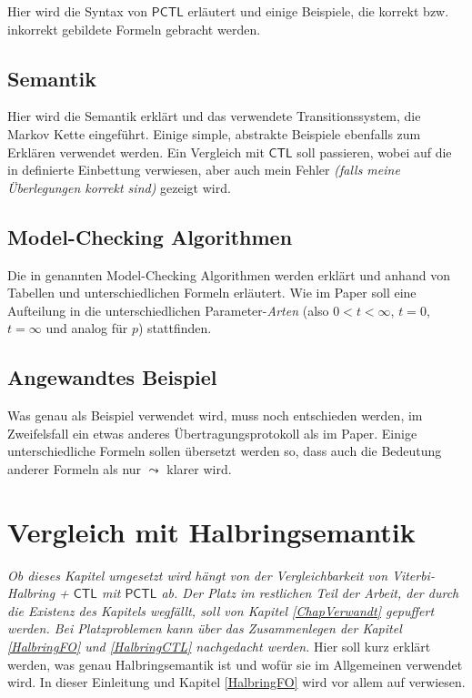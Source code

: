 \documentclass{lni}
\newcommand{\CTL}{\mathsf{CTL}}
\newcommand{\PCTL}{\mathsf{PCTL}}
\begin{document}
Hier wird die Syntax von $\PCTL$ erläutert und einige Beispiele, die korrekt bzw. inkorrekt gebildete Formeln gebracht werden.

\subsection{Semantik}

Hier wird die Semantik erklärt und das verwendete Transitionssystem, die Markov Kette eingeführt. 
Einige simple, abstrakte Beispiele ebenfalls zum Erklären verwendet werden.
Ein Vergleich mit $\CTL$ soll passieren, wobei auf die in \cite{hansson1994logic} definierte Einbettung verwiesen, aber auch mein Fehler \emph{(falls meine Überlegungen korrekt sind)} gezeigt wird.

\subsection{Model-Checking Algorithmen}

Die in \cite{hansson1994logic} genannten Model-Checking Algorithmen werden erklärt und anhand von Tabellen und unterschiedlichen Formeln erläutert.
Wie im Paper soll eine Aufteilung in die unterschiedlichen Parameter-\textit{Arten} (also $0<t<\infty$, $t=0$, $t=\infty$ und analog für $p$) stattfinden.

\subsection{Angewandtes Beispiel}

Was genau als Beispiel verwendet wird, muss noch entschieden werden, im Zweifelsfall ein etwas anderes Übertragungsprotokoll als im Paper.
Einige unterschiedliche Formeln sollen übersetzt werden so, dass auch die Bedeutung anderer Formeln als nur $\leadsto$ klarer wird.

\section{Vergleich mit Halbringsemantik}

\emph{Ob dieses Kapitel umgesetzt wird hängt von der Vergleichbarkeit von Viterbi-Halbring + $\CTL$ mit $\PCTL$ ab. Der Platz im restlichen Teil der Arbeit, der durch die Existenz des Kapitels wegfällt, soll von Kapitel \ref{ChapVerwandt} gepuffert werden. Bei Platzproblemen kann über das Zusammenlegen der Kapitel \ref{HalbringFO} und \ref{HalbringCTL} nachgedacht werden.}
Hier soll kurz erklärt werden, was genau Halbringsemantik ist und wofür sie im Allgemeinen verwendet wird. In dieser Einleitung und Kapitel \ref{HalbringFO} wird vor allem auf \cite{gradel2017semiring} verwiesen.
\end{document}
